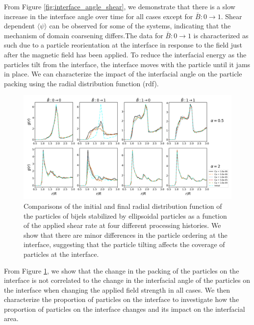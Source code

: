 From Figure \ref{fig:interface_angle_shear}, we demonstrate that there is a slow increase in the interface angle over time for all cases
except for $\bar{B}: 0 \to 1$. Shear dependent $\langle \psi \rangle$ can be observed for some of the systems, indicating that the mechanism
of domain coarsening differs.The data for $\bar{B}: 0 \to 1$ is characterized as such due to a particle reorientation at the interface
in response to the field just after the magnetic field has been applied. To reduce the interfacial energy as the particles tilt from the 
interface, the interface moves with the particle until it jams in place. We can characterize the impact of the interfacial angle on the 
particle packing using the radial distribution function (rdf).

\begin{figure} 
    \centering 
    \includegraphics[scale=0.3]{../figures/results/paper3/rdf-SS.png} 
    \caption{Comparisons of the initial and final radial distribution function of the particles of bijels stabilized by ellipsoidal 
    particles as a function of the applied shear rate at four different processing histories. We show that there are minor differences
    in the particle ordering at the interface, suggesting that the particle tilting affects the coverage of particles at the interface.} 
    \label{fig:rdf_shear} 
\end{figure}

From Figure \ref{fig:rdf_shear}, we show that the change in the packing of the particles on the interface is not correlated to the change 
in the interfacial angle of the particles on the interface when changing the applied field strength in all cases. We then characterize the proportion 
of particles on the interface to investigate how the proportion of particles on the interface changes and its impact on the interfacial area.

